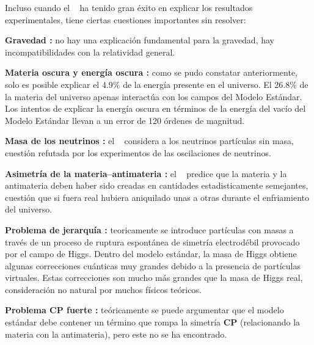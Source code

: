 Incluso cuando el \ME ~ ha tenido gran éxito en explicar los resultados experimentales, tiene ciertas cuestiones importantes sin resolver:
\begin{itemize_f}
\item[-] \textbf{Gravedad :} no hay una explicación fundamental para la gravedad, hay incompatibilidades con la relatividad general.

\item[-] \textbf{Materia oscura y energía oscura :} como se pudo constatar anteriormente, solo es posible explicar el 4.9\% de la energía presente en el universo. %
El 26.8\% de la materia del universo apenas interactúa con los campos del Modelo Estándar. %
Los intentos de explicar la energía oscura en términos de la energía del vacío del Modelo Estándar llevan a un error de 120 órdenes de magnitud.

\item[-] \textbf{Masa de los neutrinos :} el \ME ~ considera a los neutrinos partículas sin masa, cuestión refutada por los experimentos de las oscilaciones de neutrinos. %

\item[-] \textbf{Asimetría de la materia–antimateria :} el \ME ~ predice que la materia y la antimateria deben haber sido creadas en cantidades estadisticamente semejantes, cuestión que si fuera real hubiera aniquilado unas a otras durante el enfriamiento del universo.

\item[-] \textbf{Problema de jerarquía : } teoricamente se introduce partículas con masas a través de un proceso de ruptura espontánea de simetría electrodébil provocado por el campo de Higgs. Dentro del modelo estándar, la masa de Higgs obtiene algunas correcciones cuánticas muy grandes debido a la presencia de partículas virtuales. Estas correcciones son mucho más grandes que la masa de Higgs real, consideración %
no natural por muchos físicos teóricos.

\item[-] \textbf{Problema CP fuerte :} teóricamente se puede argumentar que el modelo estándar debe contener un término que rompa la simetría \textbf{CP} (relacionando la materia con la antimateria), pero este no se ha encontrado.

\end{itemize_f}




